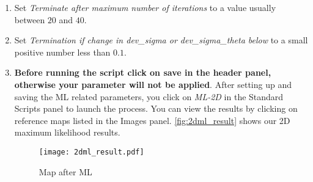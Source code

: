 \begin{enumerate}
	\item Set \textit{Terminate after maximum number of iterations} to a value usually between $20$ and $40$.
	
	\item Set \textit{Termination if change in dev\_sigma or dev\_sigma\_theta below} to a small positive number less than $0.1$.
	
	\item \textbf{Before running the script click on save in the header panel, otherwise your parameter will not be applied}. After setting up and saving the ML related parameters, you click on \textit{ML-2D} in the Standard Scripts panel to launch the process. You can view the results by clicking on reference maps listed in the Images panel. \autoref{fig:2dml_result} shows our 2D maximum likelihood results.
	
	\begin{figure}[H]
		\centering
		\texttt{[image: 2dml\_result.pdf]}
		\caption{Map after ML}
		\label{fig:2dml_result}
	\end{figure}

\end{enumerate}